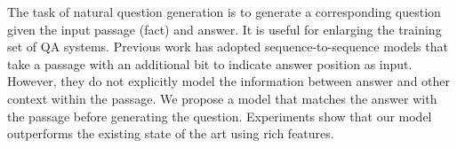 The task of natural question generation is to generate a corresponding question given the input passage (fact) and answer. It is useful for enlarging the training set of QA systems. Previous work has adopted sequence-to-sequence models that take a passage with an additional bit to indicate answer position as input. However, they do not explicitly model the information between answer and other context within the passage. We propose a model that matches the answer with the passage before generating the question. Experiments show that our model outperforms the existing state of the art using rich features.

